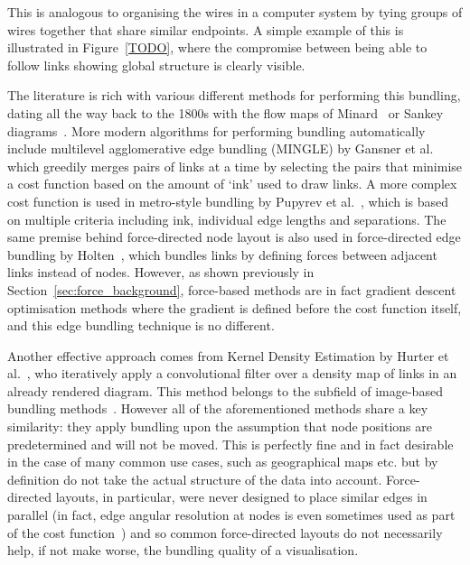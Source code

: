 This is analogous to organising the wires in a computer system by tying groups of wires together that share similar endpoints. A simple example of this is illustrated in Figure~\ref{TODO}, where the compromise between being able to follow links showing global structure is clearly visible.

The literature is rich with various different methods for performing this bundling, dating all the way back to the 1800s with the flow maps of Minard~\cite{Minard1862} or Sankey diagrams~\cite{Sankey1896}.
More modern algorithms for performing bundling automatically include multilevel agglomerative edge bundling (MINGLE) by Gansner et al.~\cite{Gansner2011} which greedily merges pairs of links at a time by selecting the pairs that minimise a cost function based on the amount of `ink' used to draw links. A more complex cost function is used in metro-style bundling by Pupyrev et al.~\cite{Pupyrev2016}, which is based on multiple criteria including ink, individual edge lengths and separations. 
The same premise behind force-directed node layout is also used in force-directed edge bundling by Holten~\cite{Holten2009}, which bundles links by defining forces between adjacent links instead of nodes. However, as shown previously in Section~\ref{sec:force_background}, force-based methods are in fact gradient descent optimisation methods where the gradient is defined before the cost function itself, and this edge bundling technique is no different.

Another effective approach comes from Kernel Density Estimation by Hurter et al.~\cite{Hurter2012}, who iteratively apply a convolutional filter over a density map of links in an already rendered diagram. This method belongs to the subfield of image-based bundling methods~\cite{Telea2018,TODO}.
However all of the aforementioned methods share a key similarity: they apply bundling upon the assumption that node positions are predetermined and will not be moved. This is perfectly fine and in fact desirable in the case of many common use cases, such as geographical maps etc. but by definition do not take the actual structure of the data into account. Force-directed layouts, in particular, were never designed to place similar edges in parallel (in fact, edge angular resolution at nodes is even sometimes used as part of the cost function~\cite{Argyriou2010}) and so common force-directed layouts do not necessarily help, if not make worse, the bundling quality of a visualisation.

